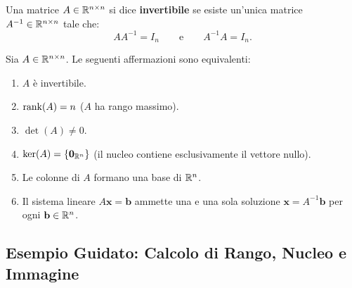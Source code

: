 \begin{definition}
Una matrice $A \in \mathbb{R}^{n \times n}$ si dice \textbf{invertibile} se esiste un'unica matrice $A^{-1} \in \mathbb{R}^{n \times n}$ tale che:
\begin{equation}
    A A^{-1} = I_n \qquad \text{e} \qquad A^{-1} A = I_n.
\end{equation}
\end{definition}

\begin{theorem}
Sia $A \in \mathbb{R}^{n \times n}$. Le seguenti affermazioni sono equivalenti:
\mbox{}\par\nopagebreak
\begin{enumerate}
    \item $A$ \`e invertibile.
    \item $\operatorname{rank}(A) = n$ ($A$ ha rango massimo).
    \item $\det(A) \neq 0$.
    \item $\ker(A) = \{ \mathbf{0}_{\mathbb{R}^n} \}$ (il nucleo contiene esclusivamente il vettore nullo).
    \item Le colonne di $A$ formano una base di $\mathbb{R}^n$.
    \item Il sistema lineare $A\mathbf{x} = \mathbf{b}$ ammette una e una sola soluzione $\mathbf{x} = A^{-1}\mathbf{b}$ per ogni $\mathbf{b} \in \mathbb{R}^n$.
\end{enumerate}
\end{theorem}

\subsection{Esempio Guidato: Calcolo di Rango, Nucleo e Immagine}

